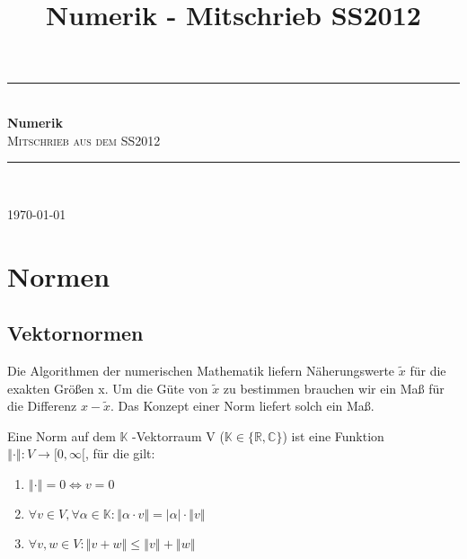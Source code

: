 \documentclass[a4paper,10pt]{scrartcl}
\title{Numerik - Mitschrieb SS2012}
\newcommand{\norm}[1]{ \left\Vert #1 \right\Vert }
\newtheorem[L]{satz}{Satz}[section]
\newtheorem[S]{beweis}{Beweis}
\newtheorem[S]{beh}{Behauptung}
\begin{document}
  \begin{titlepage}
    \thispagestyle{empty}

    \newcommand{\HRule}{\rule{\linewidth}{0.5mm}}

    \begin{center}
      \HRule \\[0.4cm]
      { \huge \bfseries Numerik}\\[0.5cm]
      \textsc{\LARGE Mitschrieb aus dem SS2012}\\
      \HRule \\[0.5cm]

      \vfill


      \vfill

      {\large \today}

    \end{center}
  \end{titlepage}
\newpage
  \thispagestyle{empty}
  \qquad
\newpage

\tableofcontents\thispagestyle{empty}
\newpage

\section{Normen}
\subsection{Vektornormen}
Die Algorithmen der numerischen Mathematik liefern Näherungswerte $\tilde{x}$ für die exakten Größen x.
Um die Güte von $\tilde{x}$ zu bestimmen brauchen wir ein Maß für die Differenz $x - \tilde{x}$.
Das Konzept einer Norm liefert solch ein Maß.

\smallskip

Eine Norm auf dem $\mathbb{K}$ -Vektorraum V ($\mathbb{K} \in \{\mathbb{R}, \mathbb{C}\}$) ist eine Funktion \\$\norm{\cdot} : V \rightarrow [0,\infty[$, für die gilt:
\begin{enumerate}
 \item $\norm{\cdot} = 0 \Leftrightarrow v = 0$
 \item $\forall v \in V, \forall \alpha \in \mathbb{K} : \norm{\alpha \cdot v} = |\alpha| \cdot \norm{v}$
 \item $\forall v, w \in V: \norm{v + w} \leq \norm{ v} + \norm{w}$
\end{enumerate}
\end{document}
